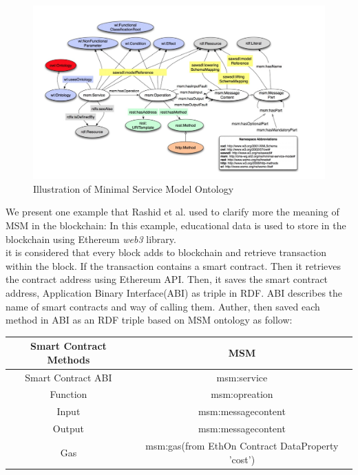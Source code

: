 \begin{center}
	\begin{figure}[htb!]
		
		\begin{minipage}{0.55\linewidth}
			\centering
			\includegraphics[width=1.95\textwidth]{images/chap02_MSM.png}
		\end{minipage}
		\caption[Illustration of Minimal Service ModelOntology]{Illustration of Minimal Service Model Ontology\cite{Rashid}}
		
	\end{figure}
	
\end{center}
We present one example that Rashid et al. used to clarify more the meaning of MSM in the blockchain: In this example, educational data is used to store in the blockchain using Ethereum \textit{web3} library.\\
it is considered that every block adds to blockchain and retrieve transaction within the block. If the transaction contains a smart contract. Then it retrieves the contract address using Ethereum API. Then, it saves the smart contract address, Application Binary Interface(ABI) as triple in RDF. ABI describes the name of smart contracts and way of calling them. Auther, then saved each method in ABI as an RDF triple based on MSM ontology as follow\cite{Rashid}:

\begin{center}
	
	\begin{tabular} { c | c }
		
		\textbf{Smart Contract Methods} & \textbf{MSM}\\
		\hline
		Smart Contract ABI & msm:service\\
		\hline
		Function   & msm:opreation\\
		\hline
		Input   & msm:messagecontent\\ 
		\hline
		Output   & msm:messagecontent\\ 
		\hline
		Gas   & msm:gas(from EthOn Contract DataProperty 'cost')
		
	\end{tabular}
	
\end{center}

